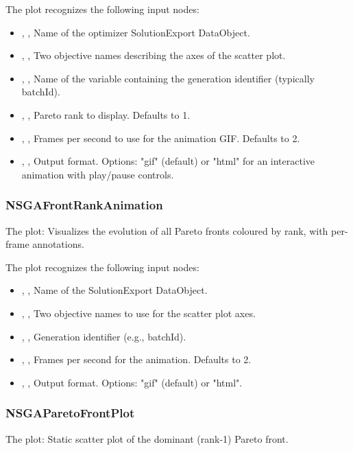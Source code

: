 The  plot recognizes the following input nodes:
\begin{itemize}
  \item {}, , Name of the optimizer SolutionExport DataObject.
  \item {}, , Two objective names describing the axes of the scatter plot.
  \item {}, , Name of the variable containing the generation identifier (typically batchId).
  \item {}, , Pareto rank to display. Defaults to 1.
  \item {}, , Frames per second to use for the animation GIF. Defaults to 2.
  \item {}, , Output format. Options: "gif" (default) or "html" for an interactive animation with play/pause controls.
\end{itemize}

\subsubsection{NSGAFrontRankAnimation}
The   plot: Visualizes the evolution of all Pareto fronts coloured by rank, with per-frame annotations.

The  plot recognizes the following input nodes:
\begin{itemize}
  \item {}, , Name of the SolutionExport DataObject.
  \item {}, , Two objective names to use for the scatter plot axes.
  \item {}, , Generation identifier (e.g., batchId).
  \item {}, , Frames per second for the animation. Defaults to 2.
  \item {}, , Output format. Options: "gif" (default) or "html".
\end{itemize}

\subsubsection{NSGAParetoFrontPlot}
The   plot: Static scatter plot of the dominant (rank-1) Pareto front.

